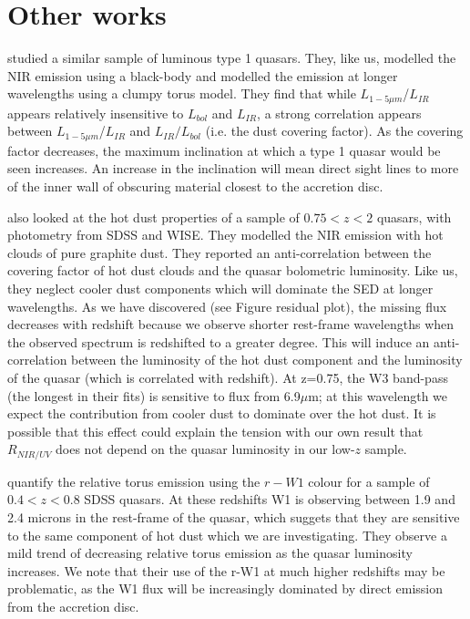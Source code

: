 \section{Other works}

\citet{roseboom13} studied a similar sample of luminous type 1 quasars. 
They, like us, modelled the NIR emission using a black-body and modelled the emission at longer wavelengths using a clumpy torus model. 
They find that while $L_{1-5\mu m}$/$L_{IR}$ appears relatively insensitive to $L_{bol}$ and $L_{IR}$, a strong correlation appears between $L_{1-5\mu m}$/$L_{IR}$ and $L_{IR}/L_{bol}$ (i.e. the dust covering factor). 
As the covering factor decreases, the maximum inclination at which a type 1 quasar would be seen increases. 
An increase in the inclination will mean direct sight lines to more of the inner wall of obscuring material closest to the accretion disc.

\citet{mor11} also looked at the hot dust properties of a sample of $0.75 < z < 2$ quasars, with photometry from SDSS and WISE. 
They modelled the NIR emission with hot clouds of pure graphite dust. 
They reported an anti-correlation between the covering factor of hot dust clouds and the quasar bolometric luminosity. 
Like us, they neglect cooler dust components which will dominate the SED at longer wavelengths. 
As we have discovered (see Figure residual plot), the missing flux decreases with redshift because we observe shorter rest-frame wavelengths when the observed spectrum is redshifted to a greater degree. 
This will induce an anti-correlation between the luminosity of the hot dust component and the luminosity of the quasar (which is correlated with redshift). 
At z=0.75, the W3 band-pass (the longest in their fits) is sensitive to flux from 6.9$\mu$m; at this wavelength we expect the contribution from cooler dust to dominate over the hot dust. 
It is possible that this effect could explain the tension with our own result that $R_{NIR/UV}$ does not depend on the quasar luminosity in our low-$z$ sample. 

\citet{shen14} quantify the relative torus emission using the $r-W1$ colour for a sample of $0.4 < z < 0.8$ SDSS quasars. 
At these redshifts W1 is observing between 1.9 and 2.4 microns in the rest-frame of the quasar, which suggets that they are sensitive to the same component of hot dust which we are investigating. 
They observe a mild trend of decreasing relative torus emission as the quasar luminosity increases. 
We note that their use of the r-W1 at much higher redshifts may be problematic, as the W1 flux will be increasingly dominated by direct emission from the accretion disc. 


